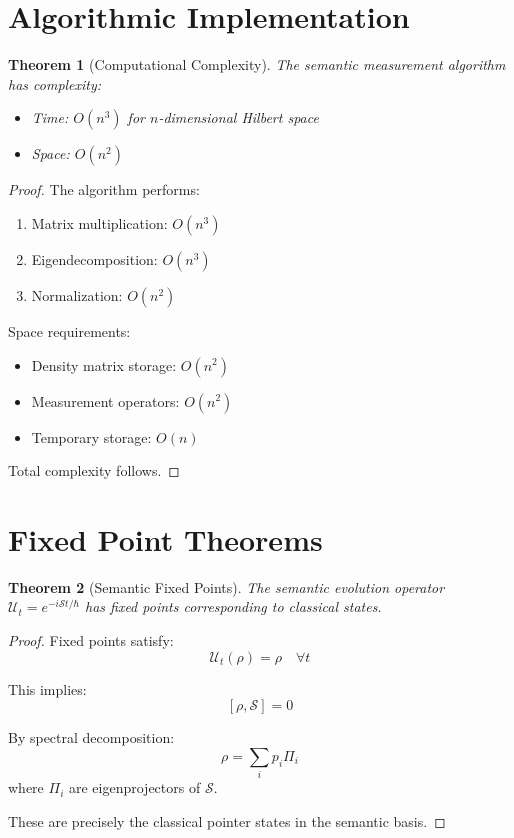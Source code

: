 \documentclass[12pt,a4paper]{article}
\theoremstyle{plain}
\newtheorem{theorem}{Theorem}[section]
\theoremstyle{definition}
\newcommand{\Sem}{\mathcal{S}}
\begin{document}
\section{Algorithmic Implementation}

\begin{theorem}[Computational Complexity]
The semantic measurement algorithm has complexity:
\begin{itemize}
\item Time: $O(n^3)$ for $n$-dimensional Hilbert space
\item Space: $O(n^2)$
\end{itemize}
\end{theorem}

\begin{proof}
The algorithm performs:
\begin{enumerate}
\item Matrix multiplication: $O(n^3)$
\item Eigendecomposition: $O(n^3)$
\item Normalization: $O(n^2)$
\end{enumerate}

Space requirements:
\begin{itemize}
\item Density matrix storage: $O(n^2)$
\item Measurement operators: $O(n^2)$
\item Temporary storage: $O(n)$
\end{itemize}

Total complexity follows.
\end{proof}

\section{Fixed Point Theorems}

\begin{theorem}[Semantic Fixed Points]
The semantic evolution operator $\mathcal{U}_t = e^{-i\Sem t/\hbar}$ has fixed points corresponding to classical states.
\end{theorem}

\begin{proof}
Fixed points satisfy:
\[
\mathcal{U}_t(\rho) = \rho \quad \forall t
\]

This implies:
\[
[\rho, \Sem] = 0
\]

By spectral decomposition:
\[
\rho = \sum_i p_i \Pi_i
\]
where $\Pi_i$ are eigenprojectors of $\Sem$.

These are precisely the classical pointer states in the semantic basis.
\end{proof}
\end{document}
